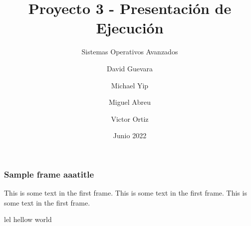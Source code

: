 \documentclass{beamer}
\title[]{Proyecto 3 - Presentación de Ejecución}
\subtitle{Sistemas Operativos Avanzados}
\author[SOA - Proyecto 3]{David Guevara \and  Michael Yip \and Miguel Abreu \and Victor Ortiz}
\institute[]{Maestría en Computación \\ Tecnológico de Costa Rica}
\date{Junio 2022}
\begin{document}
\frame{\titlepage}

\begin{frame}
\frametitle{Sample frame aaatitle}
This is some text in the first frame. This is some text in the first frame. This is some text in the first frame.
\end{frame}

lel
hellow world
\end{document}
